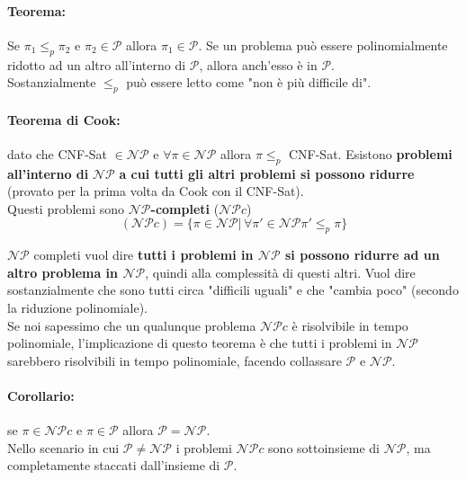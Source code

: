 \documentclass[11pt]{article}
\begin{document}
	\paragraph{Teorema:} Se $\pi_1 \leq_p \pi_2$ e $\pi_2 \in \mathcal{P}$ allora $\pi_1 \in \mathcal{P}$. Se un problema può essere polinomialmente ridotto ad un altro all'interno di $\mathcal{P}$, allora anch'esso è in $\mathcal{P}$.\\
	Sostanzialmente $\leq_p$ può essere letto come "non è più difficile di".\\
	
	\newpage
	
	\paragraph{Teorema di Cook:} dato che CNF-Sat $\in \mathcal{NP}$ e $\forall \pi \in \mathcal{NP}$ allora $\pi \leq_p$ CNF-Sat. Esistono \textbf{problemi all'interno di }$\mathcal{NP}$ \textbf{a cui tutti gli altri problemi si possono ridurre} (provato per la prima volta da Cook con il CNF-Sat).\\
	
	Questi problemi sono \textbf{$\mathcal{NP}$-completi} ($\mathcal{NP}c$)
	$$(\mathcal{NP}c) = \{\pi \in \mathcal{NP} | \, \forall \pi' \in \mathcal{NP} \pi' \leq_p \pi\} $$
	
	$\mathcal{NP}$ completi vuol dire \textbf{tutti i problemi in $\mathcal{NP}$ si possono ridurre ad un altro problema in $\mathcal{NP}$}, quindi alla complessità di questi altri. Vuol dire sostanzialmente che sono tutti circa "difficili uguali" e che "cambia poco" (secondo la riduzione polinomiale).\\
	
	Se noi sapessimo che un qualunque problema $\mathcal{NP}c$ è risolvibile in tempo polinomiale, l'implicazione di questo teorema è che tutti i problemi in $\mathcal{NP}$ sarebbero risolvibili in tempo polinomiale, facendo collassare $\mathcal{P}$ e $\mathcal{NP}$.\\
	
	\paragraph{Corollario:} se $\pi \in \mathcal{NP}c$ e $\pi \in \mathcal{P}$ allora $\mathcal{P} = \mathcal{NP}$.\\
	
	Nello scenario in cui $\mathcal{P} \neq \mathcal{NP}$ i problemi $\mathcal{NP}c$ sono sottoinsieme di $\mathcal{NP}$, ma completamente staccati dall'insieme di $\mathcal{P}$.\\
	
\end{document}
